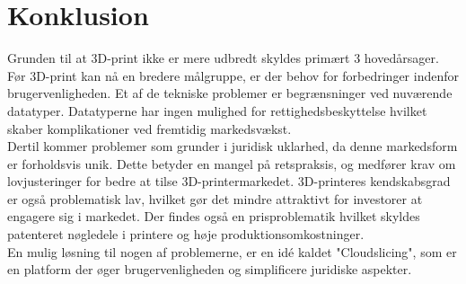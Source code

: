 	\chapter{Konklusion}
Grunden til at 3D-print ikke er mere udbredt skyldes primært 3 hovedårsager. Før 3D-print kan nå en bredere målgruppe, er der behov for forbedringer indenfor brugervenligheden. Et af de tekniske problemer er begrænsninger ved nuværende datatyper. Datatyperne har ingen mulighed for rettighedsbeskyttelse hvilket skaber komplikationer ved fremtidig markedsvækst. \\
Dertil kommer problemer som grunder i juridisk uklarhed, da denne markedsform er forholdsvis unik. Dette betyder en mangel på retspraksis, og medfører krav om lovjusteringer for bedre at tilse 3D-printermarkedet.
3D-printeres kendskabsgrad er også problematisk lav, hvilket gør det mindre attraktivt for investorer at engagere sig i markedet. Der findes også en prisproblematik hvilket skyldes patenteret nøgledele i printere og høje produktionsomkostninger. \\
En mulig løsning til nogen af problemerne, er en idé kaldet "Cloudslicing", som er en platform der øger brugervenligheden og simplificere juridiske aspekter.